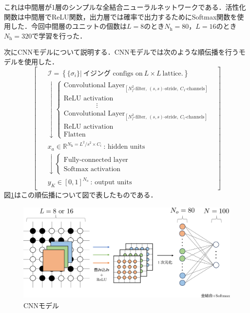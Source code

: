 \documentclass[a4paper,11pt]{jsreport}
\begin{document}
これは中間層が1層のシンプルな全結合ニューラルネットワークである．活性化関数は中間層でReLU関数，出力層では確率で出力するためにSoftmax関数を使用した．今回中間層のユニットの個数は$L=8$のとき$N_{\text{h}}=80$，$L=16$のとき$N_{\text{h}}=320$で学習を行った．\par
次にCNNモデルについて説明する．CNNモデルでは次のような順伝播を行うモデルを使用した．
\begin{equation}
  \begin{bmatrix}
    \begin{aligned}
       & \mathcal{I} = \left\{ \{ \sigma_i \} \Big| \ \text{イジング configs on} \ L \times L \ \text{lattice.} \right\} \\
       & \downarrow
      \begin{cases}
        \text{Convolutional Layer}_{[N_f^2\text{-filter}, \ (s,s)\text{-stride}, \ C_1\text{-channels}]} \\
        \text{ReLU activation} \\
        \hspace{2cm} \vdots \\
        \text{Convolutional Layer}_{[N_f^2\text{-filter}, \ (s,s)\text{-stride}, \ C_i\text{-channels}]} \\
        \text{ReLU activation} \\
        \text{Flatten}
      \end{cases} \\
       & x_a \in \mathbb{R}^{N_{\text{h}} = L^2/s^2 \times C_i} \ \text{: hidden units} \\
       & \downarrow
      \begin{cases}
        \text{Fully-connected layer} \\
        \text{Softmax activation}
      \end{cases} \\
       & y_K \in [0,1]^{N_{\text{o}}} \ \text{: output units}
    \end{aligned}
  \end{bmatrix}
\end{equation}
図\ref{温度測定器CNNモデル}はこの順伝播について図で表したものである．
\begin{figure}[H]
  \begin{center}
    \includegraphics[height=5cm]{image/温度測定器CNN.png}
    \caption{CNNモデル}
    \label{温度測定器CNNモデル}
  \end{center}
\end{figure}
\end{document}
